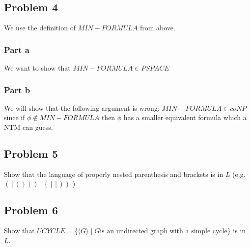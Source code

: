 \documentclass[english]{article}
\begin{document}
\subsection*{Problem 4}
We use the definition of $MIN-FORMULA$ from above.
\subsubsection{Part a}
We want to show that $MIN-FORMULA \in PSPACE$

\subsubsection{Part b}
We will show that the following argument is wrong: $MIN-FORMULA \in coNP$ since if $\phi \notin MIN-FORMULA$ then
$\phi$ has a smaller equivalent formula which a NTM can guess.

\subsection*{Problem 5}
Show that the language of properly nested parenthesis and brackets is in $L$ (e.g. $([()()]([]))$ )

\subsection*{Problem 6}
Show that $UCYCLE = \{ \langle G \rangle \mid G \textrm{is an undirected graph with a simple cycle} \}$
is in $L$.
\end{document}
